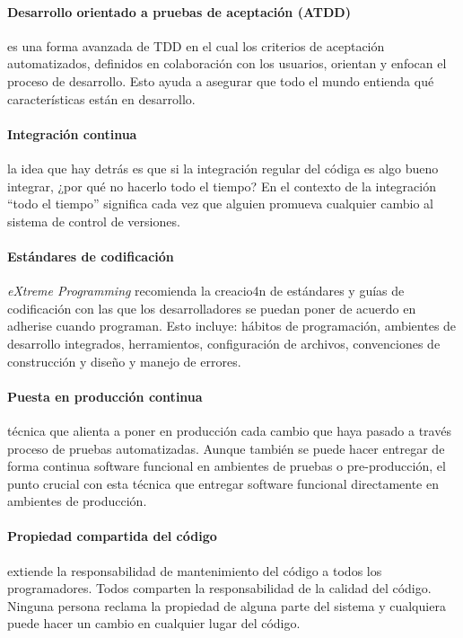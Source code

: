 \documentclass[journal]{IEEEtran}
\begin{document}
\paragraph{Desarrollo orientado a pruebas de aceptación (ATDD)} es una forma avanzada de TDD en el cual los criterios de aceptación automatizados, definidos en colaboración con los usuarios, orientan y enfocan el proceso de desarrollo. Esto ayuda a asegurar que todo el mundo entienda qué características están en desarrollo.


\paragraph{Integración continua}  la idea que hay detrás es que si la integración regular del códiga es algo bueno integrar, ¿por qué no hacerlo todo el tiempo? En el contexto de la integración ``todo el tiempo'' significa cada vez que alguien promueva cualquier cambio al sistema de control de versiones\cite{humble}. 

\paragraph{Estándares de codificación} \emph{eXtreme Programming} recomienda la creacio4n de estándares y guías de codificación con las que los desarrolladores se puedan poner de acuerdo en adherise cuando programan\cite{shore-warden}. Esto incluye: hábitos de programación, ambientes de desarrollo integrados, herramientos, configuración de archivos, convenciones de construcción y diseño y manejo de errores.

\paragraph{Puesta en producción continua} técnica que alienta a poner en producción cada cambio que haya pasado a través proceso de pruebas automatizadas. Aunque también se puede hacer entregar de forma continua software funcional en ambientes de pruebas o pre-producción, el punto crucial con esta técnica que entregar software funcional directamente en ambientes de producción\cite{humble}.

\paragraph{Propiedad compartida del código} extiende la responsabilidad de mantenimiento del código a todos los programadores. Todos comparten la responsabilidad de la calidad del código. Ninguna persona reclama la propiedad de alguna parte del sistema y cualquiera puede hacer un cambio en cualquier lugar del código\cite{shore-warden}.
\end{document}
